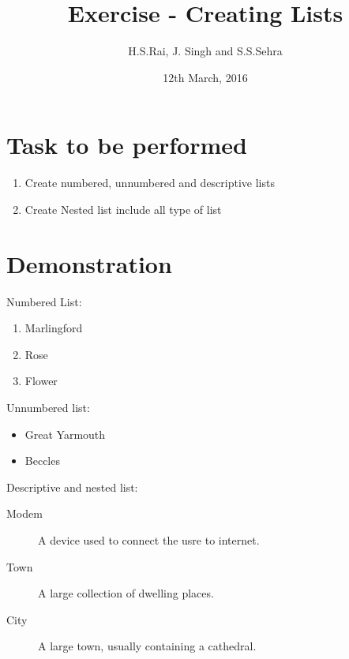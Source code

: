 \documentclass[12pt]{article}
\title{Exercise  - Creating Lists }
\author{H.S.Rai, J. Singh and S.S.Sehra}
\date{12th March, 2016}
\begin{document}
	\maketitle
	\section*{Task to be performed}
	\begin{enumerate}
		\item Create numbered, unnumbered and descriptive lists
		\item Create Nested list include all type of list
	\end{enumerate}
\section*{Demonstration}	
Numbered List:
	
\begin{enumerate}

	   	
\item Marlingford
   	
\item Rose
\item Flower
	   	
\end{enumerate}

Unnumbered list:
\begin{itemize}
\item Great Yarmouth
\item Beccles
\end{itemize}

Descriptive and nested list:
\begin{description}

  \item[Modem] A device used to connect the usre to internet.
   \item[Town] A large collection of dwelling places.    
  \item[City] A large town, usually containing a cathedral.  
\end{description}
\end{document}
